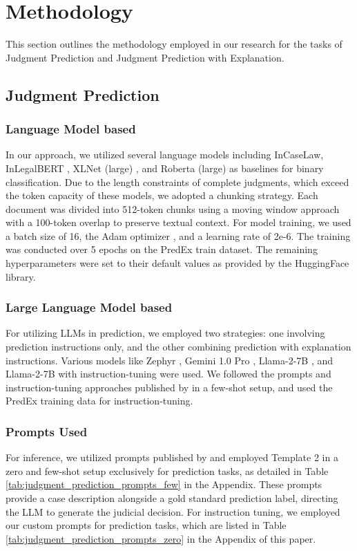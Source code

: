 \section{Methodology}
This section outlines the methodology employed in our research for the tasks of Judgment Prediction and Judgment Prediction with Explanation.

\subsection{Judgment Prediction}
\subsubsection{Language Model based}
In our approach, we utilized several language models including InCaseLaw, InLegalBERT \cite{paul-2022-pretraining}, XLNet (large) \cite{yang2019xlnet}, and Roberta (large) \cite{liu2019roberta} as baselines for binary classification. Due to the length constraints of complete judgments, which exceed the token capacity of these models, we adopted a chunking strategy. Each document was divided into 512-token chunks using a moving window approach with a 100-token overlap to preserve textual context. For model training, we used a batch size of 16, the Adam optimizer \cite{kingma2014adam}, and a learning rate of 2e-6. The training was conducted over 5 epochs on the PredEx train dataset. The remaining hyperparameters were set to their default values as provided by the HuggingFace library.

\subsubsection{Large Language Model based}
For utilizing LLMs in prediction, we employed two strategies: one involving prediction instructions only, and the other combining prediction with explanation instructions. Various models like Zephyr \cite{tunstall2023zephyr}, Gemini 1.0 Pro \cite{team2023gemini}, Llama-2-7B \cite{touvron2023llama}, and Llama-2-7B with instruction-tuning were used. We followed the prompts and instruction-tuning approaches published by \cite{vats-etal-2023-llms} in a few-shot setup, and used the PredEx training data for instruction-tuning.

\subsubsection{Prompts Used}
For inference, we utilized prompts published by \cite{vats-etal-2023-llms} and employed Template 2 in a zero and few-shot setup exclusively for prediction tasks, as detailed in Table \ref{tab:judgment_prediction_prompts_few} in the Appendix. These prompts provide a case description alongside a gold standard prediction label, directing the LLM to generate the judicial decision. For instruction tuning, we employed our custom prompts for prediction tasks, which are listed in Table \ref{tab:judgment_prediction_prompts_zero} in the Appendix of this paper.


